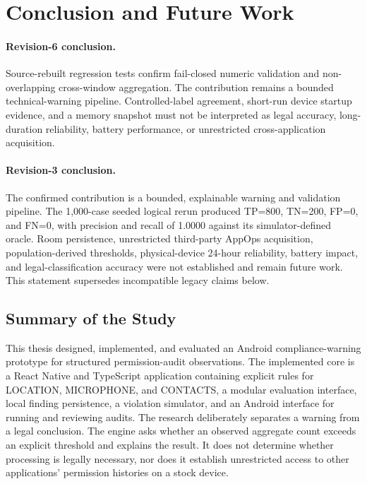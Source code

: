 \newpage
\section{Conclusion and Future Work}

\paragraph{Revision-6 conclusion.} Source-rebuilt regression tests confirm fail-closed numeric validation and non-overlapping cross-window aggregation. The contribution remains a bounded technical-warning pipeline. Controlled-label agreement, short-run device startup evidence, and a memory snapshot must not be interpreted as legal accuracy, long-duration reliability, battery performance, or unrestricted cross-application acquisition.

\paragraph{Revision-3 conclusion.} The confirmed contribution is a bounded, explainable warning and validation pipeline. The 1,000-case seeded logical rerun produced TP=800, TN=200, FP=0, and FN=0, with precision and recall of 1.0000 against its simulator-defined oracle. Room persistence, unrestricted third-party AppOps acquisition, population-derived thresholds, physical-device 24-hour reliability, battery impact, and legal-classification accuracy were not established and remain future work. This statement supersedes incompatible legacy claims below.

\subsection{Summary of the Study}

This thesis designed, implemented, and evaluated an Android compliance-warning prototype for structured permission-audit observations. The implemented core is a React Native and TypeScript application containing explicit rules for LOCATION, MICROPHONE, and CONTACTS, a modular evaluation interface, local finding persistence, a violation simulator, and an Android interface for running and reviewing audits. The research deliberately separates a warning from a legal conclusion. The engine asks whether an observed aggregate count exceeds an explicit threshold and explains the result. It does not determine whether processing is legally necessary, nor does it establish unrestricted access to other applications' permission histories on a stock device.


